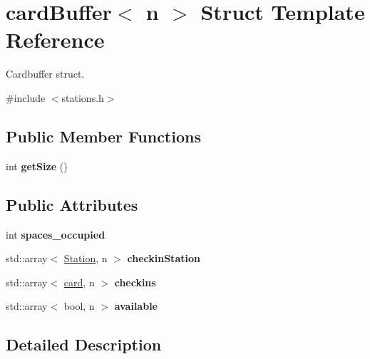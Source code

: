 \hypertarget{structcardBuffer}{}\section{card\+Buffer$<$ n $>$ Struct Template Reference}
\label{structcardBuffer}


Cardbuffer struct.  




{\ttfamily \#include $<$stations.\+h$>$}

\subsection*{Public Member Functions}
\begin{DoxyCompactItemize}
\item 
\mbox{\label{structcardBuffer_a3f9111470d3792d2211ab2d7a2dfcd5e}} 
int {\bfseries get\+Size} ()
\end{DoxyCompactItemize}
\subsection*{Public Attributes}
\begin{DoxyCompactItemize}
\item 
\mbox{\label{structcardBuffer_ad9268b7f51605832ed40de6dd5c0614d}} 
int {\bfseries spaces\+\_\+occupied}
\item 
\mbox{\label{structcardBuffer_a08f636cccb0dad601e0515cb52d819db}} 
std\+::array$<$ \hyperlink{structStation}{Station}, n $>$ {\bfseries checkin\+Station}
\item 
\mbox{\label{structcardBuffer_ae99ba4d49495e8e1d23d61381ce83c58}} 
std\+::array$<$ \hyperlink{classcard}{card}, n $>$ {\bfseries checkins}
\item 
\mbox{\label{structcardBuffer_a20fddce529cea9521d901a2569e9bc4b}} 
std\+::array$<$ bool, n $>$ {\bfseries available}
\end{DoxyCompactItemize}


\subsection{Detailed Description}

